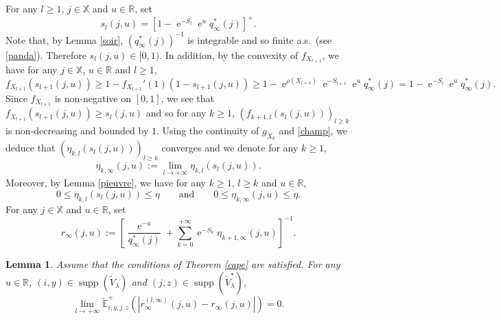\documentclass[12pt]{amsart}
\newtheorem{lemma}[theorem]{Lemma}
\theoremstyle{definition}
\numberwithin{equation}{section}
\newcommand*{\abs}[1]{\left\lvert#1\right\rvert}
\def\bb#1{\mathbb{#1}}
\def\tt#1{\tilde{#1}}
\def\tbb#1{\tilde{\mathbb{#1}}}
\def\geq{\geqslant}
\def\leq{\leqslant}
\renewcommand\ll{\lambda}
\DeclareMathOperator{\e}{e}
\DeclareMathOperator{\supp}{supp}
\begin{document}
For any $l\geq 1$, $j \in \bb X$ and $u \in \bb R$, set
\begin{equation}
	\label{pollen}
	s_l(j,u) = \left[ 1- \e^{-S_l} \e^{u} q_{\infty}^*(j) \right]^+.
\end{equation}
Note that, by Lemma \ref{soir}, $\left( q_{\infty}^*(j) \right)^{-1}$ is integrable and so finite a.s.\ (see \eqref{panda}). Therefore $s_l(j,u) \in [0,1)$. In addition, by the convexity of $f_{X_{l+1}}$, we have for any $j \in \bb X$, $u \in \bb R$ and $l \geq 1$,
\[
f_{X_{l+1}}(s_{l+1}(j,u)) \geq 1-f_{X_{l+1}}'(1) \left( 1 - s_{l+1}(j,u) \right) \geq 1-\e^{\rho(X_{l+1})} \e^{-S_{l+1}} \e^{u} q_{\infty}^*(j) = 1- \e^{-S_l} \e^{u} q_{\infty}^*(j).
\]
Since $f_{X_{l+1}}$ is non-negative on $[0,1]$, we see that $f_{X_{l+1}}(s_{l+1}(j,u)) \geq s_l(j,u)$ and so for any $k \geq 1$, $\left( f_{k+1,l}(s_l(j,u)) \right)_{l\geq k}$ is non-decreasing and bounded by $1$. Using the continuity of $g_{X_k}$ and \eqref{champ}, we deduce that $\left( \eta_{k,l}(s_l(j,u)) \right)_{l\geq k}$ converges and we denote for any $k \geq 1$,
\begin{equation}
	\label{balcon}
	\eta_{k,\infty}(j,u) := \lim_{l \to +\infty} \eta_{k,l}(s_l(j,u)).
\end{equation}
Moreover, 
by Lemma \ref{pieuvre}, we have for any $k \geq 1$, $l \geq k$ and $u \in \bb R$,
\begin{equation}
\label{clocher002}
0 \leq \eta_{k,l}(s_l(j,u)) \leq \eta \qquad \text{and} \qquad 0 \leq \eta_{k,\infty}(j,u) \leq \eta.
\end{equation}
For any $j \in \bb X$ and $u \in \bb R$, set 
\[
r_{\infty}(j,u) := \left[ \frac{\e^{-u}}{q_{\infty}^*(j)} + \sum_{k=0}^{+\infty} \e^{-S_k} \eta_{k+1,\infty}(j,u) \right]^{-1}.
\]

\begin{lemma} Assume that the conditions of Theorem \ref{cape} are satisfied.
\label{fontaine002}
For any $u \in \bb R$, $(i,y) \in \supp \left( \tt V_{\ll} \right)$ and $(j,z) \in \supp \left( \tt V_{\ll}^* \right)$,
\[
\lim_{l\to +\infty} \tbb E_{i,y,j,z}^+ \left( \abs{r_{\infty}^{(l,\infty)}(j,u) - r_{\infty}(j,u)} \right) = 0.
\]
\end{lemma}
\end{document}
